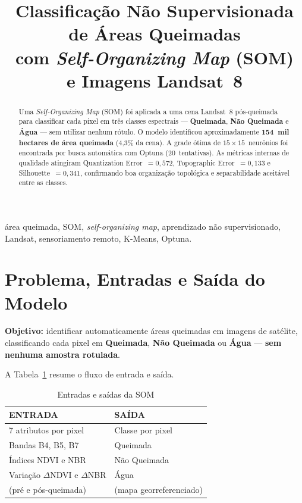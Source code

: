\documentclass[conference]{IEEEtran}
\begin{document}
\title{Classificação Não Supervisionada de Áreas Queimadas\\
com \textit{Self-Organizing Map} (SOM)\\
e Imagens Landsat~8}

\author{
}

\maketitle

\begin{abstract}
Uma \textit{Self-Organizing Map} (SOM) foi aplicada a uma cena Landsat~8
pós-queimada para classificar cada pixel em três classes espectrais —
\textbf{Queimada}, \textbf{Não Queimada} e \textbf{Água} — sem utilizar
nenhum rótulo. O modelo identificou aproximadamente \textbf{154~mil hectares
de área queimada} (4,3\% da cena). A grade ótima de $15\times15$~neurônios
foi encontrada por busca automática com Optuna (20~tentativas). As métricas
internas de qualidade atingiram Quantization Error~$= 0{,}572$,
Topographic Error~$= 0{,}133$ e Silhouette~$= 0{,}341$, confirmando boa
organização topológica e separabilidade aceitável entre as classes.
\end{abstract}

\begin{IEEEkeywords}
área queimada, SOM, \textit{self-organizing map}, aprendizado não
supervisionado, Landsat, sensoriamento remoto, K-Means, Optuna.
\end{IEEEkeywords}

\section{Problema, Entradas e Saída do Modelo}

\textbf{Objetivo:} identificar automaticamente áreas queimadas em imagens
de satélite, classificando cada pixel em \textbf{Queimada},
\textbf{Não Queimada} ou \textbf{Água} — \textbf{sem nenhuma amostra
rotulada}.

A Tabela~\ref{tab:io} resume o fluxo de entrada e saída.

\begin{table}[!t]
  \caption{Entradas e saídas da SOM}
  \label{tab:io}
  \centering
  \begin{tabular}{ll}
    \toprule
    \textbf{ENTRADA} & \textbf{SAÍDA} \\
    \midrule
    7 atributos por pixel & Classe por pixel \\
    Bandas B4, B5, B7 & Queimada \\
    Índices NDVI e NBR & Não Queimada \\
    Variação $\Delta$NDVI e $\Delta$NBR & Água \\
    (pré e pós-queimada) & (mapa georreferenciado) \\
    \bottomrule
  \end{tabular}
\end{table}
\end{document}
